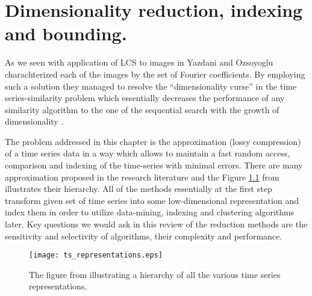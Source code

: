 \chapter{Dimensionality reduction, indexing and bounding.}
As we seen with application of LCS to images in \cite{citeulike:4367061} Yazdani and Ozsoyoglu charachterized each of the images by the set of Fourier coefficients. By employing such a solution they managed to resolve the ``dimensionality curse'' in the time series-similarity problem which essentially decreases the performance of any similarity algorithm to the one of the sequential search with the growth of dimensionality \cite{citeulike:4384496} \cite{citeulike:2843857} \cite{citeulike:4384489} \cite{citeulike:343069}.

The problem addressed in this chapter is the approximation (lossy compression) of a time series data in a way which allows to maintain a fast random access, comparison and indexing of the time-series with minimal errors. There are many approximation proposed in the research literature and the Figure \ref{fig:approximations} from \cite{citeulike:2821475} illustrates their hierarchy. All of the methods essentially at the first step transform given set of time series into some low-dimensional representation and index them in order to utilize data-mining, indexing and clustering algorithms later. Key questions we would ask in this review of the reduction methods are the sensitivity and selectivity of algorithms, their complexity and performance.

\begin{figure}[tbp]
   \centering
   \texttt{[image: ts\_representations.eps]}
   \caption{The figure from \cite{citeulike:2821475} illustrating a hierarchy of all the various time series representations.}
   \label{fig:approximations}
\end{figure} 
